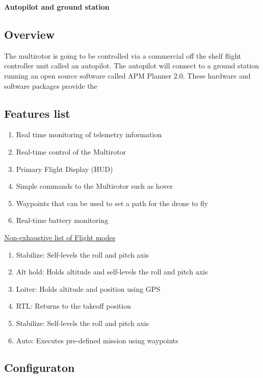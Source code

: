 \textbf{Autopilot and ground station}


\subsection{Overview}

The multirotor is going to be controlled via a commercial off the shelf flight controller unit called an autopilot. The autopilot will connect to a ground station running an open source software called APM Planner 2.0. These hardware and software packages provide the 
\subsection{Features list}

\begin{enumerate}

    \item Real time monitoring of telemetry information
    \item Real-time control of the Multirotor
    \item Primary Flight Display (HUD)
    \item Simple commands to the Multirotor such as hover
    \item Waypoints that can be used to set a path for the drone to fly
    \item Real-time battery monitoring
    
\end{enumerate}

\underline{Non-exhaustive list of Flight modes}

\begin{enumerate}

    \item Stabilize: Self-levels the roll and pitch axis
    \item Alt hold: Holds altitude and self-levels the roll and pitch axis
    \item Loiter: Holds altitude and position using GPS
    \item RTL: Returns to the takeoff position
    \item Stabilize: Self-levels the roll and pitch axis
    \item Auto: Executes pre-defined mission using waypoints
    
\end{enumerate}

\subsection{Configuraton}

